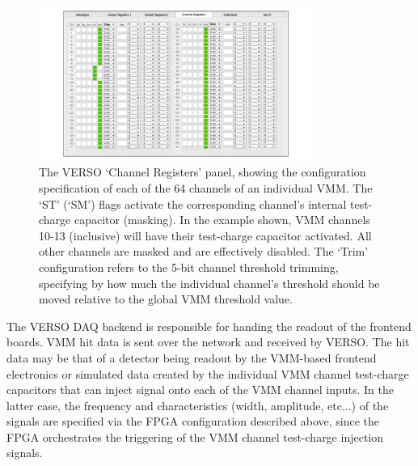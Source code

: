 \begin{figure}[!htb]
    \begin{center}
        \includegraphics[width=0.8\textwidth]{figures/nsw/vrs/verso_chanreg}
        \caption{
            The VERSO `Channel Registers' panel, showing the configuration specification
            of each of the 64 channels of an individual VMM.
            The `ST' (`SM') flags activate the corresponding channel's internal test-charge
            capacitor (masking).
            In the example shown, VMM channels 10-13 (inclusive) will have their
            test-charge capacitor activated. All other channels are masked and
            are effectively disabled.
            The `Trim' configuration refers to the 5-bit channel threshold trimming,
            specifying by how much the individual channel's threshold should be moved
            relative to the global VMM threshold value.
        }
        \label{fig:verso_chanreg}
    \end{center}
\end{figure}

The VERSO DAQ backend is responsible for handing the readout of the frontend boards.
VMM hit data is sent over the network and received by VERSO.
The hit data may be that of a detector being readout by the VMM-based frontend electronics
or simulated data created by the individual VMM channel test-charge capacitors that can inject
signal onto each of the VMM channel inputs.
In the latter case, the frequency and characteristics (width, amplitude, etc...) of the
signals are specified via the FPGA configuration described above, since the FPGA orchestrates
the triggering of the VMM channel test-charge injection signals.

